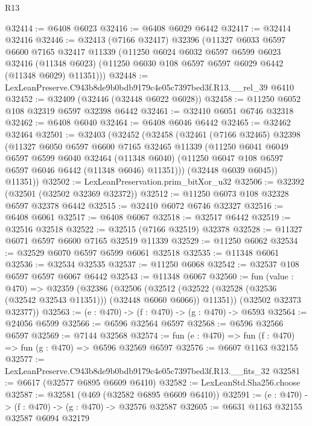 \begin{lexlean}{R13}
\begin{coremodule}
@32414 := @6408 @6023
@32416 := @6408 @6029 @6442
@32417 := @32414 @32416
@32446 := @32413
    (@7166 @32417)
    @32396
    (@11327
      @6033
      @6597
      @6600
      @7165
      @32417
      @11339
      (@11250
        @6024
        @6032
        @6597
        @6599
        @6023
        @32416
        (@11348 @6023)
        (@11250 @6030 @108 @6597 @6597 @6029 @6442 (@11348 @6029) @11351)))
@32448 := LexLeanPreserve.C943b8de9b0bdb9179c4e05c7397bed3f.R13.__rel_39 @6410
@32452 := @32409 (@32446 (@32448 @6022 @6028))
@32458 := @11250 @6052 @108 @32319 @6597 @32398 @6442
@32461 := @32410 @6051 @6746 @32318
@32462 := @6408 @6040
@32464 := @6408 @6046 @6442
@32465 := @32462 @32464
@32501 := @32403
    (@32452
      (@32458
        (@32461
          (@7166 @32465)
          @32398
          (@11327
            @6050
            @6597
            @6600
            @7165
            @32465
            @11339
            (@11250
              @6041
              @6049
              @6597
              @6599
              @6040
              @32464
              (@11348 @6040)
              (@11250 @6047 @108 @6597 @6597 @6046 @6442 (@11348 @6046) @11351)))
          (@32448 @6039 @6045))
        @11351))
@32502 := LexLeanPreservation.prim_bitXor_u32
@32506 := @32392 (@32501 (@32502 @32369 @32372))
@32512 := @11250 @6073 @108 @32328 @6597 @32378 @6442
@32515 := @32410 @6072 @6746 @32327
@32516 := @6408 @6061
@32517 := @6408 @6067
@32518 := @32517 @6442
@32519 := @32516 @32518
@32522 := @32515 (@7166 @32519) @32378
@32528 := @11327 @6071 @6597 @6600 @7165 @32519 @11339
@32529 := @11250 @6062
@32534 := @32529 @6070 @6597 @6599 @6061 @32518
@32535 := @11348 @6061
@32536 := @32534 @32535
@32537 := @11250 @6068
@32542 := @32537 @108 @6597 @6597 @6067 @6442
@32543 := @11348 @6067
@32560 := fun (value : @470) =>
  @32359
    (@32386
      (@32506
        (@32512 (@32522 (@32528 (@32536 (@32542 @32543 @11351))) (@32448 @6060 @6066)) @11351))
      (@32502 @32373 @32377))
@32563 := (e : @470) -> (f : @470) -> (g : @470) -> @6593
@32564 := @24056 @6599
@32566 := @6596 @32564 @6597
@32568 := @6596 @32566 @6597
@32569 := @7144 @32568
@32574 := fun (e : @470) => fun (f : @470) => fun (g : @470) => @6596 @32569 @6597
@32576 := @6607 @1163 @32155
@32577 := LexLeanPreserve.C943b8de9b0bdb9179c4e05c7397bed3f.R13.__fits_32
@32581 := @6617 (@32577 @6895 @6609 @6410)
@32582 := LexLeanStd.Sha256.choose
@32587 := @32581 (@469 (@32582 @6895 @6609 @6410))
@32591 := (e : @470) -> (f : @470) -> (g : @470) -> @32576 @32587
@32605 := @6631
    @1163
    @32155
    @32587
    @6094
    @32179

\end{coremodule}
\end{lexlean}
